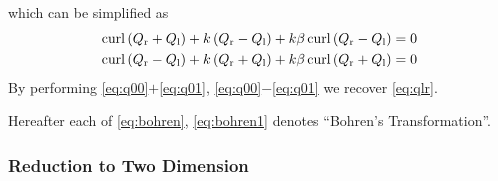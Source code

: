 which can be simplified as
\begin{align}
  \operatorname{curl}\left(Q_\text{r} + Q_\text{l}\right) + k\left(Q_\text{r} - Q_\text{l}\right) + k\beta\operatorname{curl}\left(Q_\text{r} - Q_\text{l}\right) &= 0 \label{eq:q00} \\
  \operatorname{curl}\left(Q_\text{r} - Q_\text{l}\right) + k\left(Q_\text{r} + Q_\text{l}\right) + k\beta\operatorname{curl}\left(Q_\text{r} + Q_\text{l}\right) &= 0 \label{eq:q01}
\end{align}
By performing \eqref{eq:q00}$+$\eqref{eq:q01}, \eqref{eq:q00}$-$\eqref{eq:q01} we recover \eqref{eq:qlr}.

Hereafter each of \eqref{eq:bohren}, \eqref{eq:bohren1} denotes ``Bohren's Transformation''.

%
%

\subsubsection{Reduction to Two Dimension}

